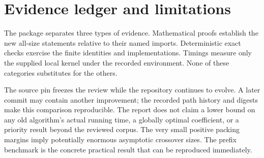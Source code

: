 \documentclass[11pt,letterpaper]{article}
\theoremstyle{definition}\newtheorem{definition}[theorem]{Definition}
\theoremstyle{remark}\newtheorem{remark}[theorem]{Remark}
\begin{document}
\section{Evidence ledger and limitations}
The package separates three types of evidence. Mathematical proofs establish the new
all-size statements relative to their named imports. Deterministic exact checks exercise
the finite identities and implementations. Timings measure only the supplied local
kernel under the recorded environment. None of these categories substitutes for the others.

The source pin freezes the review while the repository continues to evolve. A later
commit may contain another improvement; the recorded path history and digests make this
comparison reproducible. The report does not claim a lower bound on any old algorithm's
actual running time, a globally optimal coefficient, or a priority result beyond the
reviewed corpus. The very small positive packing margins imply potentially enormous
asymptotic crossover sizes. The prefix benchmark is the concrete practical result that
can be reproduced immediately.
\end{document}
